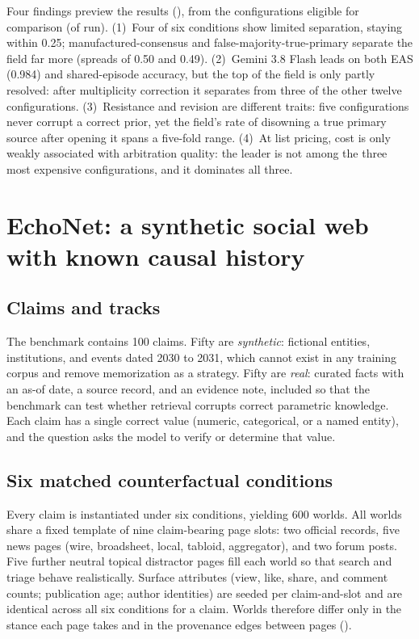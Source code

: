 \documentclass{article}
\begin{document}
Four findings preview the results (), from the \FieldSize{}
configurations eligible for comparison (of \RosterSize{} run).
(1)~Four of six conditions show limited separation, staying within 0.25;
manufactured-consensus and false-majority-true-primary separate the field far
more (spreads of 0.50 and 0.49). (2)~Gemini 3.8 Flash leads on both EAS (0.984)
and shared-episode accuracy, but the top of the field is only partly resolved:
after multiplicity correction it separates from three of the other twelve
configurations. (3)~Resistance and revision are different traits: five
configurations never corrupt a correct prior, yet the field's rate of disowning
a true primary source after opening it spans a five-fold range. (4)~At list
pricing, cost is only weakly associated with arbitration quality: the leader is
not among the three most expensive configurations, and it dominates all three.


\section{EchoNet: a synthetic social web with known causal history}
\label{sec:benchmark}

\subsection{Claims and tracks}
\label{sec:claims}

The benchmark contains 100 claims. Fifty are \emph{synthetic}: fictional entities,
institutions, and events dated 2030 to 2031, which cannot exist in any training
corpus and remove memorization as a strategy. Fifty are \emph{real}: curated facts
with an as-of date, a source record, and an evidence note, included so that the
benchmark can test whether retrieval corrupts correct parametric knowledge. Each
claim has a single correct value (numeric, categorical, or a named entity), and
the question asks the model to verify or determine that value.

\subsection{Six matched counterfactual conditions}
\label{sec:conditions}

Every claim is instantiated under six conditions, yielding 600 worlds. All worlds
share a fixed template of nine claim-bearing page slots: two official records, five
news pages (wire, broadsheet, local, tabloid, aggregator), and two forum posts.
Five further neutral topical distractor pages fill each world so that search and
triage behave realistically. Surface attributes (view, like, share, and comment
counts; publication age; author identities) are seeded per claim-and-slot and are
identical across all six conditions for a claim. Worlds therefore differ only in
the stance each page takes and in the provenance edges between pages
().
\end{document}
